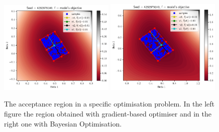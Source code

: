 
\begin{figure}[ht]
    \begin{center}
        \includegraphics[width=0.49\textwidth]{./latex_files/images/chapter4/ma2_region_1.png}
        \includegraphics[width=0.49\textwidth]{./latex_files/images/chapter4/ma2_region_1_bo.png}
    \end{center}
  \caption[The acceptance region of a specific deterministic simulator.]{The acceptance region in a specific optimisation problem. In the left figure the region obtained with gradient-based optimiser and in the right one with Bayesian Optimisation.}
  \label{fig:ma2_5}
\end{figure}


